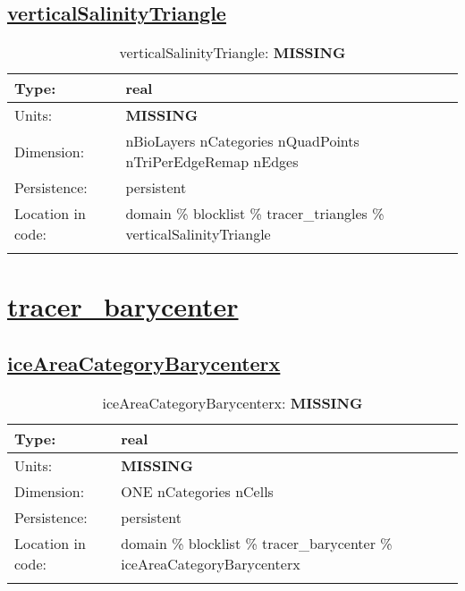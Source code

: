 \subsection[verticalSalinityTriangle]{\hyperref[sec:var_tab_tracer_triangles]{verticalSalinityTriangle}}
\label{subsec:var_sec_tracer_triangles_verticalSalinityTriangle}
\begin{center}
\begin{longtable}{| p{2.0in} | p{4.0in} |}
        \hline 
        Type: & real \\
        \hline 
        Units: & {\bf \color{red} MISSING} \\
        \hline 
        Dimension: & nBioLayers nCategories nQuadPoints nTriPerEdgeRemap nEdges \\
        \hline 
        Persistence: & persistent \\
        \hline 
         Location in code: & domain \% blocklist \% tracer\_triangles \% verticalSalinityTriangle \\
         \hline 
    \caption{verticalSalinityTriangle: {\bf \color{red} MISSING}}
\end{longtable}
\end{center}
\section[tracer\_barycenter]{\hyperref[sec:var_tab_tracer_barycenter]{tracer\_barycenter}}
\label{sec:var_sec_tracer_barycenter}
\subsection[iceAreaCategoryBarycenterx]{\hyperref[sec:var_tab_tracer_barycenter]{iceAreaCategoryBarycenterx}}
\label{subsec:var_sec_tracer_barycenter_iceAreaCategoryBarycenterx}
\begin{center}
\begin{longtable}{| p{2.0in} | p{4.0in} |}
        \hline 
        Type: & real \\
        \hline 
        Units: & {\bf \color{red} MISSING} \\
        \hline 
        Dimension: & ONE nCategories nCells \\
        \hline 
        Persistence: & persistent \\
        \hline 
         Location in code: & domain \% blocklist \% tracer\_barycenter \% iceAreaCategoryBarycenterx \\
         \hline 
    \caption{iceAreaCategoryBarycenterx: {\bf \color{red} MISSING}}
\end{longtable}
\end{center}
